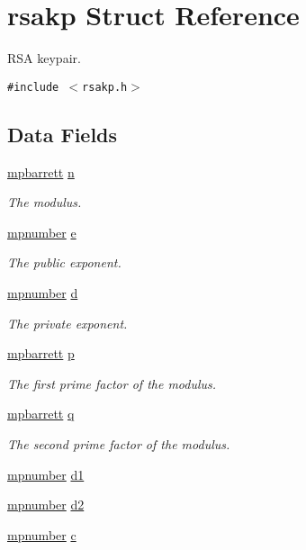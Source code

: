 \hypertarget{structrsakp}{
\section{rsakp Struct Reference}
\label{structrsakp}
}
RSA keypair.  


{\tt \#include $<$rsakp.h$>$}

\subsection*{Data Fields}
\begin{CompactItemize}
\item 
\hyperlink{structmpbarrett}{mpbarrett} \hyperlink{structrsakp_o0}{n}
\begin{CompactList}\small\item\em The modulus. \item\end{CompactList}\item 
\hyperlink{structmpnumber}{mpnumber} \hyperlink{structrsakp_o1}{e}
\begin{CompactList}\small\item\em The public exponent. \item\end{CompactList}\item 
\hyperlink{structmpnumber}{mpnumber} \hyperlink{structrsakp_o2}{d}
\begin{CompactList}\small\item\em The private exponent. \item\end{CompactList}\item 
\hyperlink{structmpbarrett}{mpbarrett} \hyperlink{structrsakp_o3}{p}
\begin{CompactList}\small\item\em The first prime factor of the modulus. \item\end{CompactList}\item 
\hyperlink{structmpbarrett}{mpbarrett} \hyperlink{structrsakp_o4}{q}
\begin{CompactList}\small\item\em The second prime factor of the modulus. \item\end{CompactList}\item 
\hyperlink{structmpnumber}{mpnumber} \hyperlink{structrsakp_o5}{d1}
\item 
\hyperlink{structmpnumber}{mpnumber} \hyperlink{structrsakp_o6}{d2}
\item 
\hyperlink{structmpnumber}{mpnumber} \hyperlink{structrsakp_o7}{c}
\end{CompactItemize}


